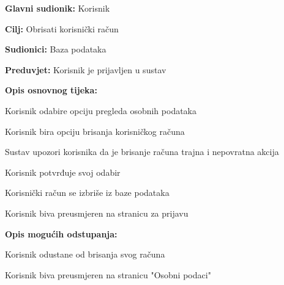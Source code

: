 					\noindent {}
					\begin{packed_item}
	
						\item \textbf{Glavni sudionik: }Korisnik
						\item  \textbf{Cilj:} Obrisati korisnički račun
						\item  \textbf{Sudionici:} Baza podataka
						\item  \textbf{Preduvjet:} Korisnik je prijavljen u sustav
						\item  \textbf{Opis osnovnog tijeka:}
						
						\item[] \begin{packed_enum}
	
							\item Korisnik odabire opciju pregleda osobnih podataka
							\item Korisnik bira opciju brisanja korisničkog računa
							\item Sustav upozori korisnika da je brisanje računa trajna i nepovratna akcija
							\item Korisnik potvrđuje svoj odabir
							\item Korisnički račun se izbriše iz baze podataka
							\item Korisnik biva preusmjeren na stranicu za prijavu
							
						\end{packed_enum}
						
						\item  \textbf{Opis mogućih odstupanja:}
						
						\item[] \begin{packed_item}
	
							\item[4.a] Korisnik odustane od brisanja svog računa
							\item[] \begin{packed_enum}
								
								\item Korisnik biva preusmjeren na stranicu "Osobni podaci"
														
							\end{packed_enum}
							
						\end{packed_item}
					\end{packed_item}
					
